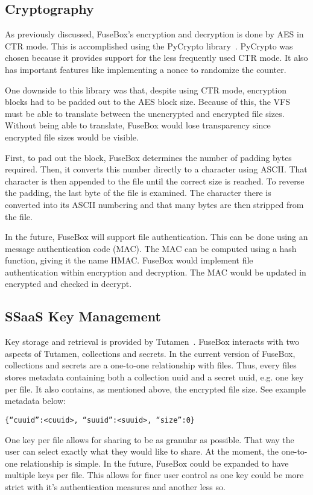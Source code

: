 \documentclass[11pt,twocolumn,letterpaper]{article}
\newcommand{\appname}{FuseBox }
\newcommand{\appnameWOspace}{FuseBox}
\newcommand{\custosWOspace}{Tutamen}
\begin{document}
\subsection{Cryptography}
\label{sec:encimp}
As previously discussed, \appnameWOspace's encryption and decryption
is done by AES in CTR mode. This is accomplished using the  PyCrypto
library~\cite{pycrypto}.
PyCrypto was chosen because it provides support for the less
frequently used CTR
mode. It also has important features like implementing a nonce to
randomize the counter. 
\par One downside to this library was that, despite using CTR mode,
encryption blocks had to be padded out to the AES block size. Because
of this, the VFS must be able to translate between the unencrypted and
encrypted file sizes. Without being able to translate, \appname would
lose transparency since encrypted file sizes would be visible. 
\par First, to pad out the block, \appname determines the number of
padding bytes required. Then, it converts this number directly to a
character using ASCII. That character is then appended to the file
until the correct size is reached. To reverse the padding, the last
byte of the file is examined. The character there is converted into
its ASCII numbering and that many bytes are then stripped from the
file. 
\par In the future, \appname will support file authentication. This
can be done using an message authentication code (MAC). The MAC can be
computed using a hash function, giving it the name HMAC. \appname
would implement file authentication within encryption and
decryption. The MAC would be updated in encrypted and checked in
decrypt. 

\subsection{SSaaS Key Management}
\label{sec:ksimp}
Key storage and retrieval is provided
by \custosWOspace~\cite{Pytutamen}. \appname interacts with two aspects
of \custosWOspace, collections and secrets. In the current version
of \appnameWOspace, collections and secrets are a one-to-one
relationship with files. Thus, every files stores metadata containing
both a collection uuid and a secret uuid, e.g. one key per file. It also contains, as
mentioned above, the encrypted file size. See example metadata below:
\begin{center}
\noindent\texttt{\{``cuuid'':<cuuid>, ``suuid'':<suuid>, ``size'':0\}}
\hspace{\columnwidth}
\end{center}
\par One key per file allows for sharing to be as granular as
possible. That way the user can select exactly what they would like to share.
At the moment, the one-to-one relationship is simple. In the future, \appname
could be expanded to have multiple keys per file. This allows for
finer user control as one key could be more strict with it's
authentication measures and another less so.   
\end{document}
